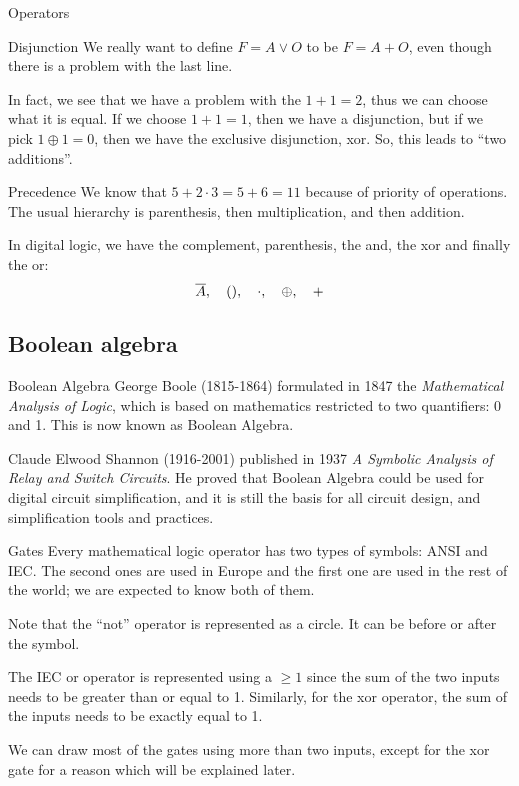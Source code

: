 \documentclass[a4paper]{article}
\begin{document}
\begin{parag}{Operators}
\begin{subparag}{Disjunction}
        We really want to define $F = A \lor O$ to be $F = A + O$, even though there is a problem with the last line. 

        In fact, we see that we have a problem with the $1 + 1 = 2$, thus we can choose what it is equal. If we choose $1 + 1 = 1$, then we have a disjunction, but if we pick $1 \oplus 1 = 0$, then we have the exclusive disjunction, xor. So, this leads to ``two additions''.
    \end{subparag}

    \begin{subparag}{Precedence}
        We know that $5 + 2\cdot 3 = 5 + 6 = 11$ because of priority of operations. The usual hierarchy is parenthesis, then multiplication, and then addition.

        In digital logic, we have the complement, parenthesis, the and, the xor and finally the or: 
        \[\bar{A}, \mathspace \left(\right), \mathspace \cdot, \mathspace \oplus, \mathspace +\]
        
    \end{subparag}
\end{parag}

\subsection{Boolean algebra}
\begin{parag}{Boolean Algebra}
    George Boole (1815-1864) formulated in 1847 the \textit{Mathematical Analysis of Logic}, which is based on mathematics restricted to two quantifiers: 0 and 1. This is now known as Boolean Algebra.

    Claude Elwood Shannon (1916-2001) published in 1937 \textit{A Symbolic Analysis of Relay and Switch Circuits}. He proved that Boolean Algebra could be used for digital circuit simplification, and it is still the basis for all circuit design, and simplification tools and practices.
\end{parag}

\begin{parag}{Gates}
    Every mathematical logic operator has two types of symbols: ANSI and IEC. The second ones are used in Europe and the first one are used in the rest of the world; we are expected to know both of them.


    Note that the ``not'' operator is represented as a circle. It can be before or after the symbol. 

    The IEC or operator is represented using a $\geq 1$ since the sum of the two inputs needs to be greater than or equal to 1. Similarly, for the xor operator, the sum of the inputs needs to be exactly equal to 1.

    We can draw most of the gates using more than two inputs, except for the xor gate for a reason which will be explained later.
\end{parag}
\end{document}
